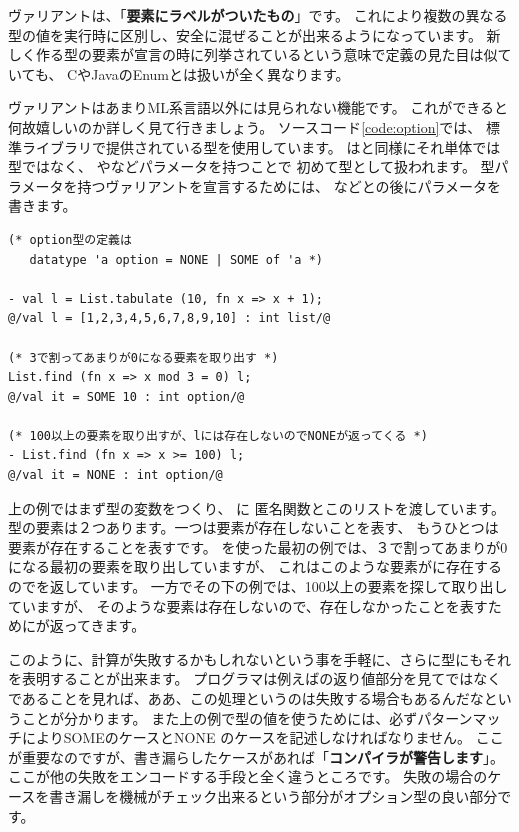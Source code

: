 \documentclass[11pt,a4paper]{article}
\begin{document}
ヴァリアントは、「\textbf{要素にラベルがついたもの}」です。
これにより複数の異なる型の値を実行時に区別し、安全に混ぜることが出来るようになっています。
新しく作る型の要素が宣言の時に列挙されているという意味で定義の見た目は似ていても、
CやJavaのEnumとは扱いが全く異なります。

ヴァリアントはあまりML系言語以外には見られない機能です。
これができると何故嬉しいのか詳しく見て行きましょう。
ソースコード\ref{code:option}では、
標準ライブラリで提供されている型を使用しています。
はと同様にそれ単体では型ではなく、
やなどパラメータを持つことで
初めて型として扱われます。
型パラメータを持つヴァリアントを宣言するためには、
などとの後にパラメータを書きます。

\begin{lstlisting}[caption=オプション型,label=code:option]
(* option型の定義は
   datatype 'a option = NONE | SOME of 'a *)

- val l = List.tabulate (10, fn x => x + 1);
@/val l = [1,2,3,4,5,6,7,8,9,10] : int list/@

(* 3で割ってあまりが0になる要素を取り出す *)
List.find (fn x => x mod 3 = 0) l;
@/val it = SOME 10 : int option/@

(* 100以上の要素を取り出すが、lには存在しないのでNONEが返ってくる *)
- List.find (fn x => x >= 100) l;
@/val it = NONE : int option/@
\end{lstlisting}

上の例ではまず型の変数をつくり、
に
匿名関数とこのリストを渡しています。
型の要素は２つあります。一つは要素が存在しないことを表す、
もうひとつは要素が存在することを表すです。
を使った最初の例では、３で割ってあまりが0になる最初の要素を取り出していますが、
これはこのような要素がに存在するのでを返しています。
一方でその下の例では、100以上の要素を探して取り出していますが、
そのような要素は存在しないので、存在しなかったことを表すためにが返ってきます。

このように、計算が失敗するかもしれないという事を手軽に、さらに型にもそれを表明することが出来ます。
プログラマは例えばの返り値部分を見てではなく
であることを見れば、ああ、この処理というのは失敗する場合もあるんだなということが分かります。
また上の例で型の値を使うためには、必ずパターンマッチによりSOMEのケースとNONE
のケースを記述しなければなりません。
ここが重要なのですが、書き漏らしたケースがあれば「{\bfseries コンパイラが警告します}」。
ここが他の失敗をエンコードする手段と全く違うところです。
失敗の場合のケースを書き漏しを機械がチェック出来るという部分がオプション型の良い部分です。
\end{document}

